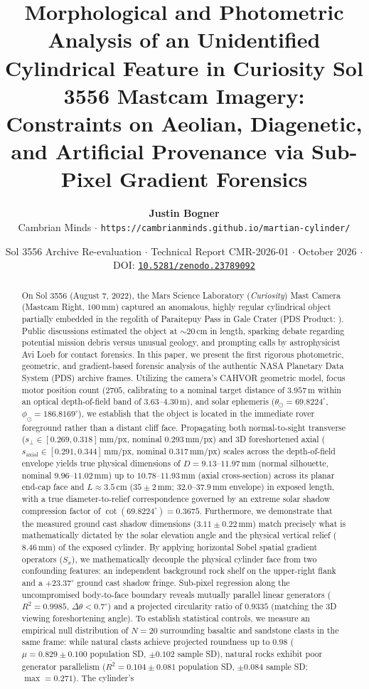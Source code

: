 \documentclass[11pt,a4paper]{article}
\title{\vspace{-1.5em}\textbf{\Large Morphological and Photometric Analysis of an Unidentified Cylindrical Feature in Curiosity Sol 3556 Mastcam Imagery:}\\[0.4em]
\large Constraints on Aeolian, Diagenetic, and Artificial Provenance via Sub-Pixel Gradient Forensics}
\author{\textbf{Justin Bogner}\\
\small Cambrian Minds $\cdot$ \texttt{https://cambrianminds.github.io/martian-cylinder/}}
\date{\small Sol 3556 Archive Re-evaluation $\cdot$ Technical Report CMR-2026-01 $\cdot$ October 2026 $\cdot$ DOI: \href{https://doi.org/10.5281/zenodo.23789092}{\texttt{10.5281/zenodo.23789092}}}
\begin{document}
\maketitle

\begin{abstract}
	On Sol 3556 (August 7, 2022), the Mars Science Laboratory (\textit{Curiosity}) Mast Camera (Mastcam Right, $100\,\text{mm}$) captured an anomalous, highly regular cylindrical object partially embedded in the regolith of Paraitepuy Pass in Gale Crater (PDS Product: ). Public discussions estimated the object at $\sim 20\,\text{cm}$ in length, sparking debate regarding potential mission debris versus unusual geology, and prompting calls by astrophysicist Avi Loeb for contact forensics. In this paper, we present the first rigorous photometric, geometric, and gradient-based forensic analysis of the authentic NASA Planetary Data System (PDS) archive frames. Utilizing the camera's CAHVOR geometric model, focus motor position count ($2705$, calibrating to a nominal target distance of $3.957\,\text{m}$ within an optical depth-of-field band of $3.63\text{--}4.30\,\text{m}$), and solar ephemeris ($\theta_\odot = 69.8224^\circ$, $\phi_\odot = 186.8169^\circ$), we establish that the object is located in the immediate rover foreground rather than a distant cliff face. Propagating both normal-to-sight transverse ($s_\perp \in [0.269, 0.318]\,\text{mm/px}$, nominal $0.293\,\text{mm/px}$) and 3D foreshortened axial ($s_{\text{axial}} \in [0.291, 0.344]\,\text{mm/px}$, nominal $0.317\,\text{mm/px}$) scales across the depth-of-field envelope yields true physical dimensions of $D = 9.13\text{--}11.97\,\text{mm}$ (normal silhouette, nominal $9.96\text{--}11.02\,\text{mm}$) up to $10.78\text{--}11.93\,\text{mm}$ (axial cross-section) across its planar end-cap face and $L \approx 3.5\,\text{cm}$ ($35 \pm 2\,\text{mm}$; $32.0\text{--}37.9\,\text{mm}$ envelope) in exposed length, with a true diameter-to-relief correspondence governed by an extreme solar shadow compression factor of $\cot(69.8224^\circ) = 0.3675$. Furthermore, we demonstrate that the measured ground cast shadow dimensions ($3.11 \pm 0.22\,\text{mm}$) match precisely what is mathematically dictated by the solar elevation angle and the physical vertical relief ($8.46\,\text{mm}$) of the exposed cylinder. By applying horizontal Sobel spatial gradient operators ($S_x$), we mathematically decouple the physical cylinder face from two confounding features: an independent background rock shelf on the upper-right flank and a $+23.37^\circ$ ground cast shadow fringe. Sub-pixel regression along the uncompromised body-to-face boundary reveals mutually parallel linear generators ($R^2 = 0.9985$, $\Delta\theta < 0.7^\circ$) and a projected circularity ratio of $0.9335$ (matching the 3D viewing foreshortening angle). To establish statistical controls, we measure an empirical null distribution of $N = 20$ surrounding basaltic and sandstone clasts in the same frame: while natural clasts achieve projected roundness up to $0.98$ ($\mu = 0.829 \pm 0.100$ population SD, $\pm 0.102$ sample SD), natural rocks exhibit poor generator parallelism ($\overline{R^2} = 0.104 \pm 0.081$ population SD, $\pm 0.084$ sample SD; $\max = 0.271$). The cylinder's 
\end{abstract}
\end{document}
